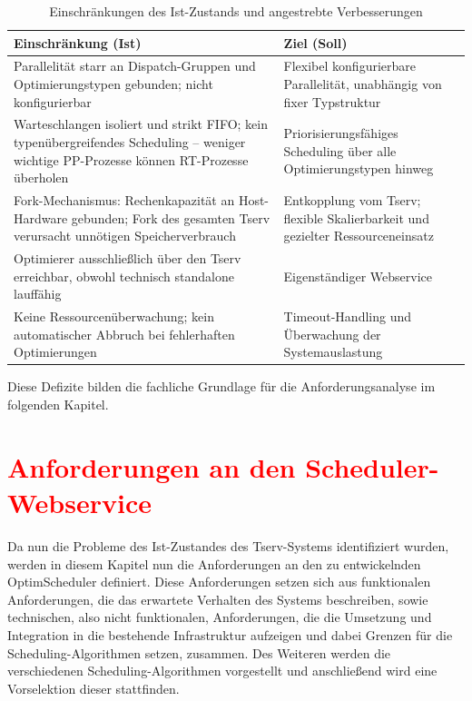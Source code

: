 \documentclass[
    12pt,               
    a4paper,            
    ngerman,            
    parskip=half,       
    headings=normal,   
    numbers=enddot,     
    toc=chapterentrywithdots 
]{scrreprt}\usepackage[utf8]{inputenc}
\begin{document}
\begin{table}[H]
    \centering
    {\setlength{\arrayrulewidth}{0.3pt}
    \begin{tabular}{p{} p{}}
        \hline
        \textbf{Einschränkung (Ist)} & \textbf{Ziel (Soll)} \\
        \hline
        Parallelität starr an Dispatch-Gruppen und Optimierungstypen gebunden; nicht konfigurierbar & Flexibel konfigurierbare Parallelität, unabhängig von fixer Typstruktur \\
        \hline
        Warteschlangen isoliert und strikt FIFO; kein typenübergreifendes Scheduling -- weniger wichtige PP-Prozesse können RT-Prozesse überholen & Priorisierungsfähiges Scheduling über alle Optimierungstypen hinweg \\
        \hline
        Fork-Mechanismus: Rechenkapazität an Host-Hardware gebunden; Fork des gesamten Tserv verursacht unnötigen Speicherverbrauch & Entkopplung vom Tserv; flexible Skalierbarkeit und gezielter Ressourceneinsatz \\
        \hline
        Optimierer ausschließlich über den Tserv erreichbar, obwohl technisch standalone lauffähig & Eigenständiger Webservice \\
        \hline
        Keine Ressourcenüberwachung; kein automatischer Abbruch bei fehlerhaften Optimierungen & Timeout-Handling und Überwachung der Systemauslastung \\
        \hline
    \end{tabular}}
    \caption{Einschränkungen des Ist-Zustands und angestrebte Verbesserungen}
    \label{tab:istprobleme}
\end{table}

Diese Defizite bilden die fachliche Grundlage für die Anforderungsanalyse im folgenden Kapitel.


\chapter{\textcolor{red}{Anforderungen an den Scheduler-Webservice}}
Da nun die Probleme des Ist-Zustandes des Tserv-Systems identifiziert wurden, werden in diesem Kapitel nun die Anforderungen an den zu entwickelnden OptimScheduler definiert. Diese Anforderungen setzen sich aus funktionalen Anforderungen, die das erwartete Verhalten des Systems beschreiben, sowie technischen, also nicht funktionalen, Anforderungen, die die Umsetzung und Integration in die bestehende Infrastruktur aufzeigen und dabei Grenzen für die Scheduling-Algorithmen setzen, zusammen. Des Weiteren werden die verschiedenen Scheduling-Algorithmen vorgestellt und anschließend wird eine Vorselektion dieser stattfinden.
\end{document}
